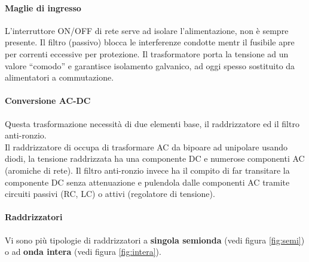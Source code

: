 \documentclass[12pt]{article}
\begin{document}
\paragraph{Maglie di ingresso} L'interruttore ON/OFF di rete serve ad isolare l'alimentazione, non è sempre presente. Il filtro (passivo) blocca le interferenze condotte mentr il fusibile apre per correnti eccessive per protezione. Il trasformatore porta la tensione ad un valore ``comodo'' e garantisce isolamento galvanico, ad oggi spesso sostituito da alimentatori a commutazione.

\paragraph{Conversione AC-DC} Questa trasformazione necessità di due elementi base, il raddrizzatore ed il filtro anti-ronzio.\\
Il raddrizzatore di occupa di trasformare AC da bipoare ad unipolare usando diodi, la tensione raddrizzata ha una componente DC e numerose componenti AC (aromiche di rete).
Il filtro anti-ronzio invece ha il compito di far transitare la componente DC senza attenuazione e pulendola dalle componenti AC tramite circuiti passivi (RC, LC) o attivi (regolatore di tensione).\\

\paragraph{Raddrizzatori} Vi sono più tipologie di raddrizzatori a \textbf{singola semionda} (vedi figura \ref{fig:semi}) o ad \textbf{onda intera} (vedi figura \ref{fig:intera}).
\end{document}
